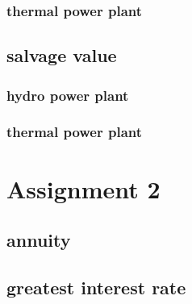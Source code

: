 \documentclass{article}
\begin{document}
\subsubsection{thermal power plant}
\subsection{salvage value}
\subsubsection{hydro power plant}
\subsubsection{thermal power plant}
\section{Assignment 2}
\subsection{annuity}
\subsection{greatest interest rate}
\end{document}
